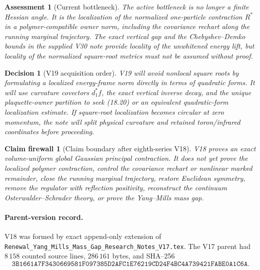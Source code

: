 \documentclass[11pt,oneside]{book}
\newtheorem{assessment}[theorem]{Assessment}
\newtheorem{firewall}[theorem]{Claim firewall}
\newtheorem{decision}[theorem]{Decision}
\theoremstyle{definition}
\theoremstyle{remark}
\begin{document}
\begin{assessment}[Current bottleneck]
\label{ass:e8v18-bottleneck}
The active bottleneck is no longer a finite Hessian angle.  It is the
localization of the normalized one-particle contraction \(R^*\) in a
polymer-compatible owner norm, including the covariance rechart along
the running marginal trajectory.  The exact vertical gap and the
Chebyshev--Demko bounds in the supplied V30 note provide locality of
the unwhitened energy lift, but locality of the normalized square-root
metrics must not be assumed without proof.
\end{assessment}

\begin{decision}[V19 acquisition order]
\label{dec:e8v18-v19}
V19 will avoid nonlocal square roots by formulating a localized
energy-frame norm directly in terms of quadratic forms.  It will use
curvature covectors \(d_1^*f\), the exact vertical inverse decay, and
the unique plaquette-owner partition to seek (18.20) or an equivalent
quadratic-form localization estimate.  If square-root localization
becomes circular at zero momentum, the note will split physical
curvature and retained toron/infrared coordinates before proceeding.
\end{decision}

\begin{firewall}[Claim boundary after eighth-series V18]
\label{fire:e8v18-claim}
V18 proves an exact volume-uniform global Gaussian principal
contraction.  It does not yet prove the localized polymer contraction,
control the covariance rechart or nonlinear marked remainder, close
the running marginal trajectory, restore Euclidean symmetry, remove
the regulator with reflection positivity, reconstruct the continuum
Osterwalder--Schrader theory, or prove the Yang--Mills mass gap.
\end{firewall}

\paragraph{Parent-version record.}
V18 was formed by exact append-only extension of
\texttt{Renewal\_Yang\_Mills\_Mass\_Gap\_Research\_Notes\_V17.tex}.
The V17 parent had \(8\,158\) counted source lines,
\(286\,161\) bytes, and SHA--256
\[
\texttt{3B1661A7F3430669581F097385D2AFC1E76219CD24F4BC4A739421FABE0A1C6A}.
\]

\end{document}
